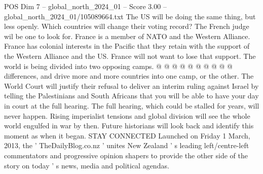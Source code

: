 \begin{textsample}{POS Dim 7 – global\_north\_2024\_01 – Score 3.00 – global\_north\_2024\_01/105089664.txt}
The US will be doing the same thing, but less openly.
Which countries will change their voting record?
The French judge wil be one to look for.
France is a member of NATO and the Western Alliance.
France has colonial interests in the Pacific that they retain with the support of the Western Alliance and the US.
France will not want to lose that support.
The world is being divided into two opposing camps. @ @ @ @ @ @ @ @ @ @ differences, and drive more and more countries into one camp, or the other.
The World Court will justify their refusal to deliver an interim ruling against Israel by telling the Palestinians and South Africans that you will be able to have your day in court at the full hearing.
The full hearing, which could be stalled for years, will never happen.
Rising imperialist tensions and global division will see the whole world engulfed in war by then.
Future historians will look back and identify this moment as when it began.
STAY CONNECTED Launched on Friday 1 March, 2013, the ' TheDailyBlog.co.nz ' unites New Zealand ' s leading left/centre-left commentators and progressive opinion shapers to provide the other side of the story on today ' s news, media and political agendas.

\end{textsample}
